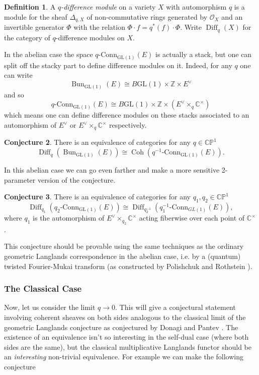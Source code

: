 \documentclass[11pt, oneside, reqno]{amsart}
\theoremstyle{definition} \newtheorem{definition}{Definition}[section]
\newtheorem{conjecture}[definition]{Conjecture}
\theoremstyle{definition} \newtheorem{remark}[definition]{Remark}
\theoremstyle{definition} \newtheorem{remarks}[definition]{Remarks}
\theoremstyle{definition} \newtheorem{question}[definition]{Question}
\theoremstyle{definition} \newtheorem*{note}{Note}
\theoremstyle{definition} \newtheorem{example}[definition]{Example}
\theoremstyle{definition} \newtheorem{examples}[definition]{Examples}
\newcommand{\bb}[1]{\mathbb{#1}}
\newcommand{\CC}{\mathbb{C}}
\newcommand{\OO}{\mathcal{O}}
\newcommand{\ZZ}{\mathbb{Z}}
\newcommand{\GL}{\mathrm{GL}}
\newcommand{\iso}{\cong}
\DeclareMathOperator{\coh}{Coh}
\DeclareMathOperator{\bun}{Bun}
\DeclareMathOperator{\diff}{Diff}
\newcommand{\qconn}{q\text{-Conn}}
\newcommand{\conn}{\text{-Conn}}
\begin{document}
\begin{definition}
A \emph{$q$-difference module} on a variety $X$ with automorphism $q$ is a module for the sheaf $\Delta_{q,X}$ of non-commutative rings generated by $\OO_X$ and an invertible generator $\Phi$ with the relation $\Phi \cdot f = q^*(f) \cdot \Phi$.  Write $\diff_q(X)$ for the category of $q$-difference modules on $X$.
\end{definition}

In the abelian case the space $\qconn_{\GL(1)}(E)$ is actually a stack, but one can split off the stacky part to define difference modules on it.  Indeed, for any $q$ one can write
\[\bun_{\GL(1)}(E) \iso B\GL(1) \times \ZZ \times E^\vee\]
and so
\[\qconn_{\GL(1)}(E) \iso B\GL(1) \times \ZZ \times (E^\vee \times_q \CC^\times)\]
which means one can define difference modules on these stacks associated to an automorphism of $E^\vee$ or $E^\vee \times_q \CC^\times$ respectively.

\begin{conjecture}
There is an equivalence of categories for any $q \in \bb{CP}^1$
\[\diff_q(\bun_{\GL(1)}(E)) \iso \coh(q^{-1}\conn_{\GL(1)}(E)).\]
\end{conjecture}

In this abelian case we can go even farther and make a more sensitive 2-parameter version of the conjecture.

\begin{conjecture}
There is an equivalence of categories for any $q_1, q_2 \in \bb{CP}^1$
\[\diff_{q_1}(q_2\conn_{\GL(1)}(E)) \iso \diff_{q_2^{-1}}(q_1^{-1}\conn_{GL(1)}(E)),\]
where $q_1$ is the automorphism of $E^\vee \times_{q_2} \CC^\times$ acting fiberwise over each point of $\CC^\times$.
\end{conjecture}

This conjecture should be provable using the same techniques as the ordinary geometric Langlands correspondence in the abelian case, i.e. by a (quantum) twisted Fourier-Mukai transform (as constructed by Polishchuk and Rothstein \cite{PolishchukRothstein}).

\subsubsection{The Classical Case}
Now, let us consider the limit $q \to 0$.  This will give a conjectural statement involving coherent sheaves on both sides analogous to the classical limit of the geometric Langlands conjecture as conjectured by Donagi and Pantev \cite{DonagiPantev}.  The existence of an equivalence isn't so interesting in the self-dual case (where both sides are the same), but the classical multiplicative Langlands functor should be an \emph{interesting} non-trivial equivalence.  For example we can make the following conjecture
\end{document}
